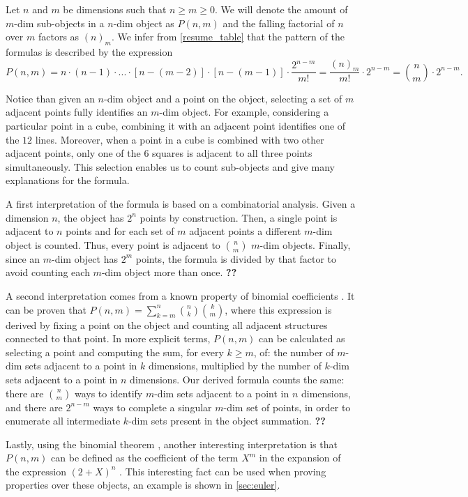 \documentclass{article}
\begin{document}
	
	Let $n$ and $m$ be dimensions such that $n \geq m \geq 0$. We will denote the amount of $m$-dim sub-objects in a $n$-dim object as $P(n,m)$ and the falling factorial of $n$ over $m$ factors as $(n)_{m}$. We infer from \autoref{resume_table} that the pattern of the formulas is described by the expression \cite{coxeter1973regular}
	$$P(n,m) = n \cdot (n-1)\cdot ... \cdot [n-(m-2)] \cdot [n-(m-1)] \cdot \frac{2^{n-m}}{m!} = \frac{(n)_{m}}{m!} \cdot 2^{n-m} = \binom{n}{m}\cdot2^{n-m} .$$
	
	Notice than given an $n$-dim object and a point on the object, selecting a set of $m$ adjacent points fully identifies an $m$-dim object. For example, considering a particular point in a cube, combining it with an adjacent point identifies one of the $12$ lines. Moreover, when a point in a cube is combined with two other adjacent points, only one of the $6$ squares is adjacent to all three points simultaneously. This selection enables us to count sub-objects and give many explanations for the formula.
	
	A first interpretation of the formula is based on a combinatorial analysis. Given a dimension $n$, the object has $2^{n}$ points by construction. Then, a single point is adjacent to $n$ points and for each set of $m$ adjacent points a different $m$-dim object is counted. Thus, every point is adjacent to $\binom{n}{m}$ $m$-dim objects. Finally, since an $m$-dim object has $2^{m}$ points, the formula is divided by that factor to avoid counting each $m$-dim object more than once. \textbf{??}
	
	A second interpretation comes from a known property of binomial coefficients \cite{rice2007}. It can be proven that $P(n,m) = \sum_{k=m}^{n} \binom{n}{k} \binom{k}{m}$, where this expression is derived by fixing a point on the object and counting all adjacent structures connected to that point. In more explicit terms, $P(n,m)$ can be calculated as selecting a point and computing the sum, for every $k\geq m$, of: the number of $m$-dim sets adjacent to a point in $k$ dimensions, multiplied by the number of $k$-dim sets adjacent to a point in $n$ dimensions. Our derived formula counts the same: there are $\binom{n}{m}$ ways to identify $m$-dim sets adjacent to a point in $n$ dimensions, and there are $2^{n-m}$ ways to complete a singular $m$-dim set of points, in order to enumerate all intermediate $k$-dim sets present in the object summation. \textbf{??}
	
	Lastly, using the binomial theorem \cite{rice2007}, another interesting interpretation is that $P(n,m)$ can be defined as the coefficient of the term $X^{m}$ in the expansion of the expression $(2 + X)^{n}$ \cite{coxeter1973regular}. This interesting fact can be used when proving properties over these objects, an example is shown in \autoref{sec:euler}.
	
\end{document}
